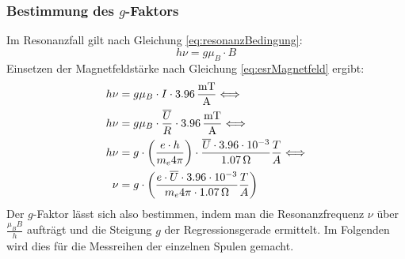 \documentclass[a4paper,titlepage]{scrartcl}
\numberwithin{equation}{section}
\begin{document}
\subsubsection{Bestimmung des $g$-Faktors}
Im Resonanzfall gilt nach Gleichung \ref{eq:resonanzBedingung}:
\begin{equation*}
h \nu=g \mu_B \cdot B
\end{equation*}
Einsetzen der Magnetfeldstärke nach Gleichung \ref{eq:esrMagnetfeld} ergibt:
\begin{align}
h \nu&=g\mu_B \cdot I \cdot \unit[3.96]{\frac{mT}{A}} \Longleftrightarrow \nonumber \\
h \nu&=g\mu_B \cdot \frac{\overline{U}}{R} \cdot \unit[3.96]{\frac{mT}{A}} \Longleftrightarrow \nonumber \\
h \nu&=g \cdot \left( \frac{e \cdot h}{m_e 4 \pi} \right) \cdot \frac{\overline{U} \cdot 3.96 \cdot 10^{-3}}{\unit[1.07]{\Omega}} \frac{T}{A} \Longleftrightarrow \nonumber \\
\nu&=g \cdot \left( \frac{e \cdot \overline{U} \cdot 3.96 \cdot 10^{-3}}{m_e 4 \pi \cdot \unit[1.07]{\Omega}} \frac{T}{A} \right) \label{eq:gauswertung}
\end{align}
Der $g$-Faktor lässt sich also bestimmen, indem man die Resonanzfrequenz $\nu$ über $\frac{\mu_B B}{h}$ aufträgt und die Steigung $g$ der Regressionsgerade ermittelt. Im Folgenden wird dies für die Messreihen der einzelnen Spulen gemacht.
\end{document}
